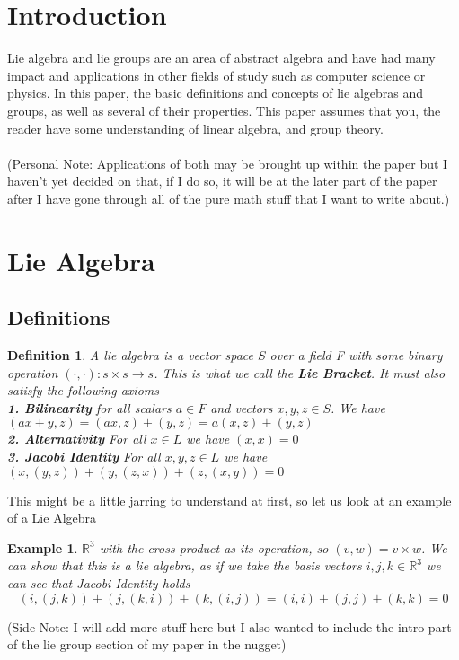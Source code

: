 \documentclass[12pt]{article}
\newcommand{\R}{\mathbb{R}}
\newtheorem*{defn}{Definition}
\newtheorem{ex}[thm]{Example}
\begin{document}
\section*{Introduction}
	Lie algebra and lie groups are an area of abstract algebra and have had many impact and applications in other fields of study such as computer science or physics. In this paper, the basic definitions and concepts of lie algebras and groups, as well as several of their properties. This paper assumes that you, the reader have some understanding of linear algebra, and group theory.\\\\
	(Personal Note: Applications of both may be brought up within the paper but I haven't yet decided on that, if I do so, it will be at the later part of the paper after I have gone through all of the pure math stuff that I want to write about.)

\section{Lie Algebra}
\subsection{Definitions}
\begin{defn}
A lie algebra is a vector space $S$ over a field F with some binary operation $( \cdot, \cdot ): s \times s \rightarrow s$. This is what we call the \textbf{Lie Bracket}. It must also satisfy the following axioms\\
\textbf{1. Bilinearity} for all scalars $a \in F$ and vectors $x,y,z \in S$. We have $(ax+y, z) = (ax, z) + (y,z) = a(x, z) + (y,z)$\\
\textbf{2. Alternativity} For all $x \in L$ we have $(x, x) = 0$ \\
\textbf{3. Jacobi Identity} For all $x,y,z \in L$ we have $(x, (y, z)) + (y, (z, x)) + (z, (x, y)) = 0$
\end{defn}

This might be a little jarring to understand at first, so let us look at an example of a Lie Algebra
\begin{ex}
$\R^3$ with the cross product as its operation, so $(v, w) = v \times w$. We can show that this is a lie algebra, as if we take the basis vectors $i, j, k \in \R^3$ we can see that Jacobi Identity holds
\[
	(i, (j, k)) + (j, (k, i)) + (k, (i , j)) = (i, i) + (j, j) + (k, k) = 0
\]
\end{ex}
(Side Note: I will add more stuff here but I also wanted to include the intro part of the lie group section of my paper in the nugget)
\end{document}
